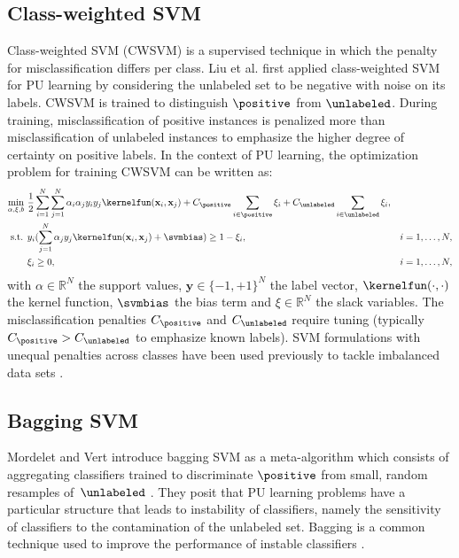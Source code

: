 \subsection{Class-weighted SVM} \label{resvm:bsvm}
Class-weighted SVM (CWSVM) is a supervised technique in which the penalty for misclassification differs per class. Liu et al. \citep{Liu:2003:BTC:951949.952139} first applied class-weighted SVM for PU learning by considering the unlabeled set to be negative with noise on its labels. CWSVM is trained to distinguish $\positive$ from $\unlabeled$. During training, misclassification of positive instances is penalized more than misclassification of unlabeled instances to emphasize the higher degree of certainty on positive labels. In the context of PU learning, the optimization problem for training CWSVM can be written as:
\begin{align}
\min_{\alpha,\xi,b}\ & \frac{1}{2}\sum_{i=1}^N\sum_{j=1}^N \alpha_i\alpha_j y_i y_j \kernelfun(\mathbf{x}_i,\mathbf{x}_j)+C_{\positive}\sum_{i \in\positive} \xi_i + C_{\unlabeled}\sum_{i\in\unlabeled} \xi_i, \label{resvm:eq:bsvm} \\
\text{s.t. } &y_i(\sum_{j=1}^N \alpha_j y_j \kernelfun(\mathbf{x}_i,\mathbf{x}_j)+\svmbias)\geq 1-\xi_i, &i=1,\ldots,N, \nonumber \\
&\xi_i \geq 0, &i=1,\ldots,N, \nonumber
\end{align}
with $\alpha \in \mathbb{R}^N$ the support values, $\mathbf{y} \in \{-1,+1\}^N$ the label vector, $\kernelfun(\cdot,\cdot)$ the kernel function, $\svmbias$ the bias term and $\xi \in \mathbb{R}^N$ the slack variables. The misclassification penalties $C_{\positive}$ and $C_{\unlabeled}$ require tuning (typically $C_{\positive} > C_{\unlabeled}$ to emphasize known labels). SVM formulations with unequal penalties across classes have been used previously to tackle imbalanced data sets \citep{osuna1997}. 

\subsection{Bagging SVM} \label{resvm:baggingsvm}
Mordelet and Vert introduce bagging SVM as a meta-algorithm which consists of aggregating classifiers trained to discriminate $\positive$ from small, random resamples of\ $\unlabeled$ \citep{mordelet2014bagging}. They posit that PU learning problems have a particular structure that leads to instability of classifiers, namely the sensitivity of classifiers to the contamination of the unlabeled set.  Bagging is a common technique used to improve the performance of instable classifiers \citep{Breiman:1996:BP:231986.231989}.

